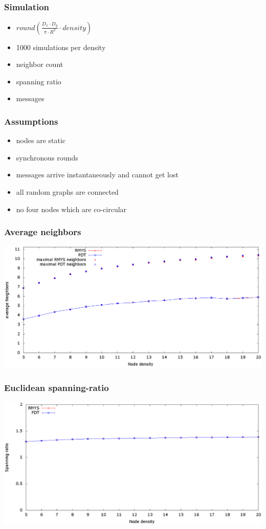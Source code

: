 \documentclass[compress]{beamer}
\begin{document}
\subsection{}

\begin{frame}
\frametitle{Simulation}
\begin{itemize}
\item $round(\frac{D_x \cdot D_y}{\pi \cdot R^2} \cdot density) $
\item 1000 simulations per density
\end{itemize}
\begin{itemize}
\item neighbor count
\item spanning ratio
\item messages
\end{itemize}
\end{frame}

\begin{frame}
\frametitle{Assumptions}
\begin{itemize}
\item nodes are static
\item synchronous rounds
\item messages arrive instantaneously and cannot get lost
\item all random graphs are connected
\item no four nodes which are co-circular
\end{itemize}
\end{frame}

\begin{frame} 
\frametitle{Average neighbors}
\center	\includegraphics[width=1.0\linewidth]{RMYS_PDT_avrNeighbors.eps}
\end{frame}

\begin{frame} 
\frametitle{Euclidean spanning-ratio}
\center	\includegraphics[width=1.0\linewidth]{RMYS_PDT_SpanningRatio.eps}
\end{frame}
\end{document}
